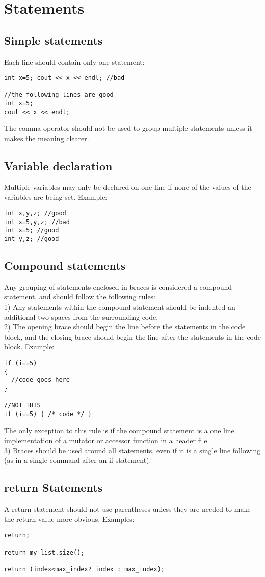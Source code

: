 \documentclass[letterpaper,10pt]{article}
\begin{document}
\section{Statements}
\subsection{Simple statements}
Each line should contain only one statement:
\begin{verbatim}
int x=5; cout << x << endl; //bad

//the following lines are good
int x=5;
cout << x << endl;
\end{verbatim}
The comma operator should not be used to group multiple statements unless it makes the meaning clearer.
\subsection{Variable declaration}
Multiple variables may only be declared on one line if none of the values of the variables are being set. Example:
\begin{verbatim}
int x,y,z; //good
int x=5,y,z; //bad
int x=5; //good
int y,z; //good
\end{verbatim}
\subsection{Compound statements}
Any grouping of statements enclosed in braces is considered a compound statement, and should follow the following rules:\\
1) Any statements within the compound statement should be indented an additional two spaces from the surrounding code.\\
2) The opening brace should begin the line before the statements in the code block, and the closing brace should begin the line after the statements in the code block.  Example: \\
\begin{verbatim}
if (i==5)
{
  //code goes here
}

//NOT THIS
if (i==5) { /* code */ }
\end{verbatim}
The only exception to this rule is if the compound statement is a one line implementation of a mutator or accessor function in a header file.\\
3) Braces should be used around all statements, even if it is a single line following (as in a single command after an if statement).
\subsection{return Statements}
A return statement should not use parentheses unless they are needed to make the return value more obvious.  Examples:
\begin{verbatim}
return;

return my_list.size();

return (index<max_index? index : max_index);
\end{verbatim}
\end{document}
